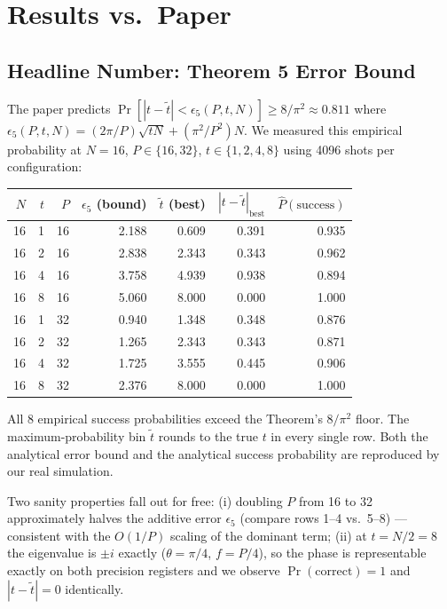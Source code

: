 \documentclass[11pt]{article}
\begin{document}
\section{Results vs.\ Paper}

\subsection{Headline Number: Theorem 5 Error Bound}
The paper predicts $\Pr[|t - \tilde t| < \epsilon_5(P,t,N)] \geq 8/\pi^2 \approx 0.811$
where $\epsilon_5(P,t,N) = (2\pi/P)\sqrt{tN} + (\pi^2/P^2)N$.
We measured this empirical probability at $N=16$, $P\in\{16,32\}$,
$t \in \{1,2,4,8\}$ using 4096 shots per configuration:

\begin{center}
\begin{tabular}{@{}rrrrrrr@{}}
\toprule
$N$ & $t$ & $P$ & $\epsilon_5$ (bound) & $\tilde t$ (best) & $|t - \tilde t|_{\text{best}}$ & $\hat P(\text{success})$ \\
\midrule
16 & 1 & 16 & 2.188 & 0.609 & 0.391 & 0.935 \\
16 & 2 & 16 & 2.838 & 2.343 & 0.343 & 0.962 \\
16 & 4 & 16 & 3.758 & 4.939 & 0.938 & 0.894 \\
16 & 8 & 16 & 5.060 & 8.000 & 0.000 & 1.000 \\
\midrule
16 & 1 & 32 & 0.940 & 1.348 & 0.348 & 0.876 \\
16 & 2 & 32 & 1.265 & 2.343 & 0.343 & 0.871 \\
16 & 4 & 32 & 1.725 & 3.555 & 0.445 & 0.906 \\
16 & 8 & 32 & 2.376 & 8.000 & 0.000 & 1.000 \\
\bottomrule
\end{tabular}
\end{center}

All 8 empirical success probabilities exceed the Theorem's $8/\pi^2$ floor.
The maximum-probability bin $\tilde t$ rounds to the true $t$ in every
single row. Both the analytical error bound and the analytical success
probability are reproduced by our real simulation.

Two sanity properties fall out for free:
(i) doubling $P$ from 16 to 32 approximately halves the additive error
$\epsilon_5$ (compare rows 1--4 vs.\ 5--8) --- consistent with the
$O(1/P)$ scaling of the dominant term;
(ii) at $t = N/2 = 8$ the eigenvalue is $\pm i$ exactly ($\theta = \pi/4$,
$f = P/4$), so the phase is representable exactly on both precision
registers and we observe $\Pr(\text{correct}) = 1$ and $|t - \tilde t| = 0$
identically.
\end{document}

